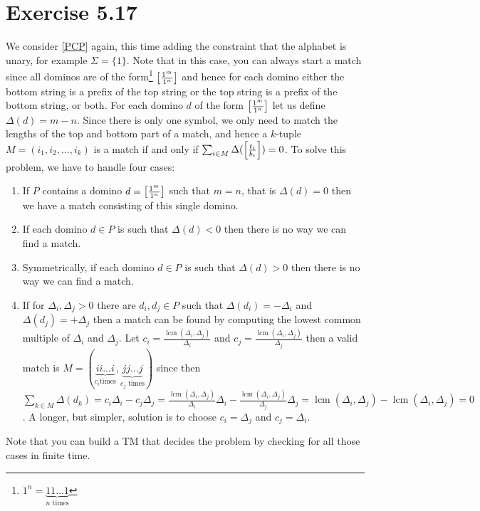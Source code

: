 \section{Exercise 5.17}
We consider \ref{PCP} again, this time adding the constraint that the alphabet
is unary, for example \(\Sigma = \{1\}\). Note that in this case, you can always start a
match since all dominos are of the form\footnote{\(1^n = \underbrace{11\ldots1}_{n \text{ times}}\)}
\(\mleft[\frac{1^m}{1^n}\mright]\)
and hence for each domino either the bottom string is a prefix of the top
string or the top string is a prefix of the bottom string, or both.
For each domino \(d\) of the form \(\mleft[\frac{1^m}{1^n}\mright]\) let us
define \(\Delta(d) = m - n\). Since there is only one symbol,
we only need to match the lengths of the
top and bottom part of a match, and hence a \(k\)-tuple \(M = (i_1,i_2,\ldots,i_k)\)
is a match if and only if \(\sum_{i \in M}
	\Delta(\mleft[\frac{t_i}{b_i}\mright]) = 0\).
To solve this problem, we have to handle four cases:
\begin{enumerate}
	\item If \(P\) contains a domino \(d=\mleft[\frac{1^m}{1^n}\mright]\) such that
		\(m=n\), that is \(\Delta(d) = 0\) then we have a match consisting of this single domino.
	\item If each domino \(d \in P\) is such that \(\Delta(d) < 0\) then there
		is no way we can find a match.
	\item Symmetrically, if each domino \(d \in P\) is such that \(\Delta(d) > 0\) then there
		is no way we can find a match.
	\item If for \(\Delta_i, \Delta_j > 0\) there are \(d_i,d_j \in P\) such
		that \(\Delta(d_i) = -\Delta_i\) and \(\Delta(d_j) = +\Delta_j\) then a
		match can be found by computing the lowest common multiple of
		\(\Delta_i\) and \(\Delta_j\). Let \(c_i =
			\frac{\mathop{lcm}(\Delta_i,\Delta_j)}{\Delta_i}\) and \(c_j =
			\frac{\mathop{lcm}(\Delta_i,\Delta_j)}{\Delta_j}\) then a valid
			match is \(M = (\underbrace{i i \ldots i}_{c_i \text{
							times}},\underbrace{j j \ldots j}_{c_j
			\text{ times}})\) since then \(\sum_{k \in M}
	\Delta(d_k) = c_i \Delta_i - c_j \Delta_j
= \frac{\mathop{lcm}(\Delta_i,\Delta_j)}{\Delta_i} \Delta_i -
\frac{\mathop{lcm}(\Delta_i,\Delta_j)}{\Delta_j} \Delta_j
=\mathop{lcm}(\Delta_i,\Delta_j) - \mathop{lcm}(\Delta_i,\Delta_j)
= 0\). A longer, but simpler, solution is to choose $c_i = \Delta_j$ and $c_j =
\Delta_i$.
\end{enumerate}
Note that you can build a TM that decides the problem by checking for all those
cases in finite time.

